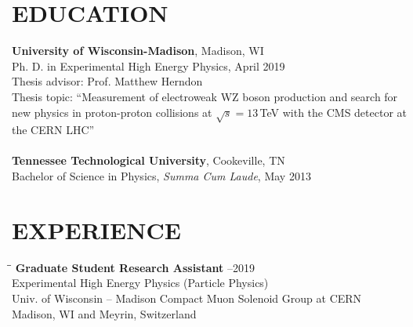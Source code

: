 \documentclass[10pt]{res} %
\begin{document}

\address{{\bf Current Address} \\  Physics Department, 2320 Chamberlin Hall \\  University of Wisconsin--Madison\\ Madison, WI  53706}
\address{{\bf Permanent Address} \\ 141 County Hill Rd. \\ Blountville,
TN 37617 \\ (608) 443-9459}

\begin{resume}

\section{EDUCATION}
  \textbf{University of Wisconsin-Madison}, Madison, WI \\
Ph. D. in Experimental High Energy Physics, April 2019 \\
  Thesis advisor: Prof. Matthew Herndon \\
  Thesis topic: ``Measurement of electroweak WZ boson production and search for new physics in proton-proton collisions at $\sqrt{s}=13$\,TeV with the CMS detector at the CERN LHC'' \\
\\
  \textbf{Tennessee Technological University}, Cookeville, TN \\
Bachelor of Science in Physics, \textit{Summa Cum Laude}, May 2013 \\

\section{EXPERIENCE}
\vspace{-0.1in}
\begin{tabbing}
\hspace{2.3in}\= \hspace{2.5in}\= \kill %
{\bf Graduate Student Research Assistant} \>--2019\\
Experimental High Energy Physics  (Particle Physics)\\
Univ. of Wisconsin -- Madison Compact Muon Solenoid Group at CERN   \\  Madison, WI and Meyrin, Switzerland \\
\end{tabbing}\vspace{-20pt}      %


\end{resume}
\end{document}
